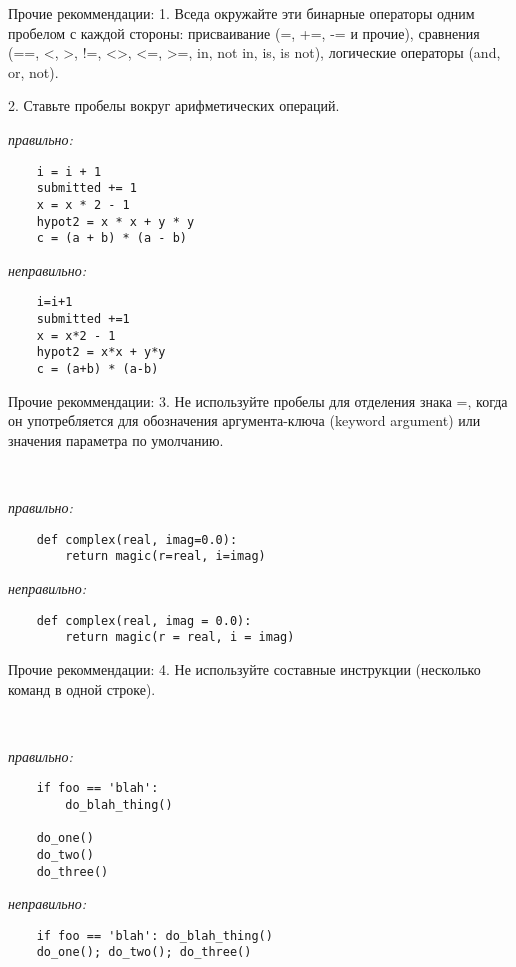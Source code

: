 \documentclass[xcolor=table]{beamer}
\begin{document}
\begin{frame}[fragile]{Прочие рекоммендации:}
	1. Вседа окружайте эти бинарные операторы одним пробелом с каждой стороны: присваивание (=, +=, -= и прочие), сравнения (==, <, >, !=, <>, <=, >=, in, not in, is, is not), логические операторы (and, or, not).
	
	2. Ставьте пробелы вокруг арифметических операций.
	
	\textit{правильно:}	
	\begin{verbatim}
	i = i + 1 
	submitted += 1 
	x = x * 2 - 1 
	hypot2 = x * x + y * y 
	c = (a + b) * (a - b) 
	\end{verbatim}
	\textit{неправильно:}	
	\begin{verbatim}
	i=i+1 
	submitted +=1 
	x = x*2 - 1 
	hypot2 = x*x + y*y 
	c = (a+b) * (a-b)
	\end{verbatim}
\end{frame}

\begin{frame}[fragile]{Прочие рекоммендации:}
	3. Не используйте пробелы для отделения знака =, когда он употребляется для обозначения аргумента-ключа (keyword argument) или значения параметра по умолчанию.
	
	~
	
	\textit{правильно:}	
	\begin{verbatim}
	def complex(real, imag=0.0): 
    	return magic(r=real, i=imag) 
	\end{verbatim}
	\textit{неправильно:}	
	\begin{verbatim}
	def complex(real, imag = 0.0): 
    	return magic(r = real, i = imag) 
	\end{verbatim}
\end{frame}

\begin{frame}[fragile]{Прочие рекоммендации:}
	4. Не используйте составные инструкции (несколько команд в одной строке).
	
	~
	
	\textit{правильно:}	
	\begin{verbatim}
	if foo == 'blah': 
    	do_blah_thing() 
	
	do_one() 
	do_two() 
	do_three() 
	\end{verbatim}
	\textit{неправильно:}	
	\begin{verbatim}
	if foo == 'blah': do_blah_thing() 
	do_one(); do_two(); do_three()
	\end{verbatim}
\end{frame}
\end{document}
